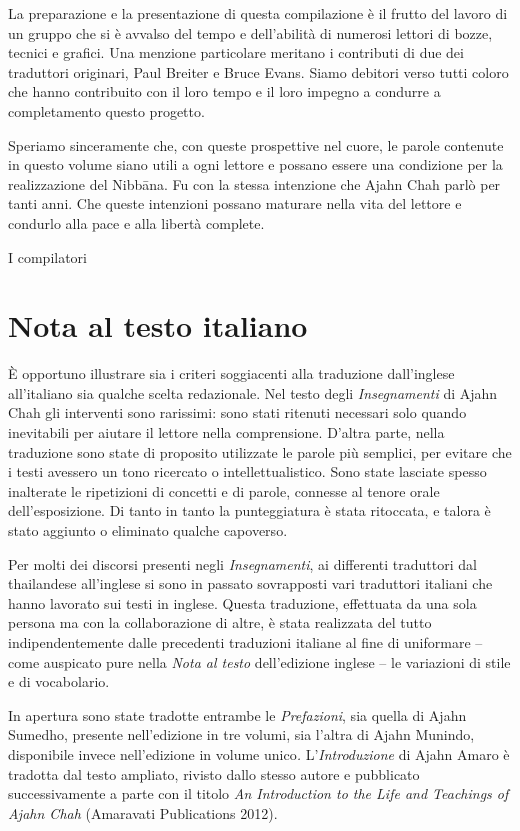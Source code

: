 La preparazione e la presentazione di questa compilazione è il frutto
del lavoro di un gruppo che si è avvalso del tempo e dell'abilità di
numerosi lettori di bozze, tecnici e grafici. Una menzione particolare
meritano i contributi di due dei traduttori originari, Paul Breiter e
Bruce Evans. Siamo debitori verso tutti coloro che hanno contribuito con
il loro tempo e il loro impegno a condurre a completamento questo
progetto.

Speriamo sinceramente che, con queste prospettive nel cuore, le parole
contenute in questo volume siano utili a ogni lettore e possano essere
una condizione per la realizzazione del Nibbāna. Fu con la stessa
intenzione che Ajahn Chah parlò per tanti anni. Che queste intenzioni
possano maturare nella vita del lettore e condurlo alla pace e alla
libertà complete.

\bigskip

{\raggedleft
  I compilatori
\par}

\section{Nota al testo italiano}

È opportuno illustrare sia i criteri soggiacenti alla traduzione
dall'inglese all'italiano sia qualche scelta redazionale. Nel testo
degli \emph{Insegnamenti} di Ajahn Chah gli interventi sono rarissimi:
sono stati ritenuti necessari solo quando inevitabili per aiutare il
lettore nella comprensione. D'altra parte, nella traduzione sono state
di proposito utilizzate le parole più semplici, per evitare che i testi
avessero un tono ricercato o intellettualistico. Sono state lasciate
spesso inalterate le ripetizioni di concetti e di parole, connesse al
tenore orale dell'esposizione. Di tanto in tanto la punteggiatura è
stata ritoccata, e talora è stato aggiunto o eliminato qualche
capoverso.

Per molti dei discorsi presenti negli \emph{Insegnamenti}, ai differenti
traduttori dal thailandese all'inglese si sono in passato sovrapposti
vari traduttori italiani che hanno lavorato sui testi in inglese. Questa
traduzione, effettuata da una sola persona ma con la collaborazione di
altre, è stata realizzata del tutto indipendentemente dalle precedenti
traduzioni italiane al fine di uniformare -- come auspicato pure nella
\emph{Nota al testo} dell'edizione inglese -- le variazioni di stile e
di vocabolario.

In apertura sono state tradotte entrambe le \emph{Prefazioni}, sia
quella di Ajahn Sumedho, presente nell'edizione in tre volumi, sia
l'altra di Ajahn Munindo, disponibile invece nell'edizione in volume
unico\emph{.} L'\emph{Introduzione} di Ajahn Amaro è tradotta dal testo
ampliato, rivisto dallo stesso autore e pubblicato successivamente a
parte con il titolo \emph{An Introduction to the Life and Teachings of
Ajahn Chah} (Amaravati Publications 2012).

